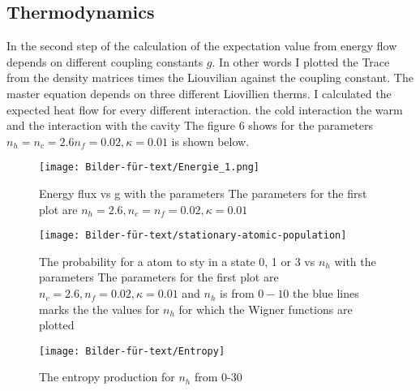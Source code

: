 \documentclass[12pt,a4paper]{article}
\begin{document}
\subsection{Thermodynamics}
In the second step of the calculation of the  expectation value from energy flow depends on different coupling constants $g$.
In other words I plotted the Trace from the density matrices times the Liouvilian against the coupling constant.
The master equation depends on three different Liovillien therms. I calculated the expected heat flow for every different interaction. the cold interaction the warm and the interaction with the cavity
The figure 6 shows  for the parameters $n_h=n_c=2.6 n_f=0.02,\kappa=0.01 $ is shown below.

\begin{figure}[hbtp]
\centering
\texttt{[image: Bilder-für-text/Energie\_1.png]}
\caption{Energy flux vs g with the parameters The parameters for the first plot are $ n_h=2.6,n_c= n_f=0.02,\kappa=0.01 $}
\end{figure}



\begin{figure}[hbtp]
\centering
\texttt{[image: Bilder-für-text/stationary-atomic-population]}
\caption{The probability for a atom to sty in a state 0, 1 or 3 vs $n_h$ with the parameters The parameters for the first plot are $n_c=2.6 ,n_f=0.02,\kappa=0.01 $ and $n_h$ is from $0-10$ the blue lines marks the the values for $ n_h$ for which the Wigner functions are plotted }
\end{figure}

\begin{figure}[hbtp]
\centering
\texttt{[image: Bilder-für-text/Entropy]}
\caption{The entropy production for $n_h$ from 0-30}
\end{figure}
\newpage
\end{document}
